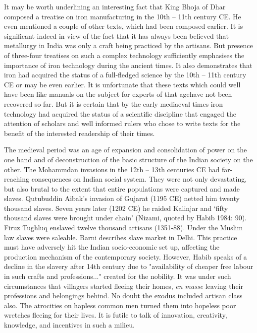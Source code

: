 It may be worth underlining an interesting fact that King Bhoja of Dhar composed a treatise on iron manufacturing in the 10th – 11th century CE. He even mentioned a couple of other texts, which had been composed earlier. It is significant indeed in view of the fact that it has always been believed that metallurgy in India was only a craft being practiced by the artisans. But presence of three-four treatises on such a complex technology sufficiently emphasises the importance of iron technology during the ancient times. It also demonstrates that iron had acquired the status of a full-fledged science by the 10th – 11th century CE or may be even earlier. It is unfortunate that these texts which could well have been like manuals on the subject for experts of that agehave not been recovered so far. But it is certain that by the early mediaeval times iron technology had acquired the status of a scientific discipline that engaged the attention of scholars and well informed rulers who chose to write texts for the benefit of the interested readership of their times.

The medieval period was an age of expansion and consolidation of power on the one hand and of deconstruction of the basic structure of the Indian society on the other. The Mohammdan invasions in the 12th – 13th centuries CE had far-reaching consequences on Indian social system. They were not only devastating, but also brutal to the extent that entire populations were captured and made slaves. Qutubuddin Aibak's invasion of Gujarat (1195 CE) netted him twenty thousand slaves. Seven years later (1202 CE) he raided Kalinjar and `fifty thousand slaves were brought under chain' (Nizami, quoted by Habib 1984: 90). Firuz Tughluq enslaved twelve thousand artisans (1351-88). Under the Muslim law slaves were saleable. Barni describes slave market in Delhi. This practice must have adversely hit the Indian socio-economic set up, affecting the production mechanism of the contemporary society. However, Habib speaks of a decline in the slavery after 14th century due to "availability of cheaper free labour in such crafts and professions..." created for the nobility. It was under such circumstances that villagers started fleeing their homes, \textit{en masse} leaving their professions and belongings behind. No doubt the exodus included artisan class also. The atrocities on hapless common men turned them into hopeless poor wretches fleeing for their lives. It is futile to talk of innovation, creativity, knowledge, and incentives in such a milieu.

